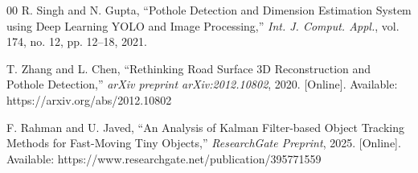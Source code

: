 \documentclass{iopjournal}
\begin{document}
\begin{thebibliography}{00}
R. Singh and N. Gupta, ``Pothole Detection and Dimension Estimation System using Deep Learning YOLO and Image Processing,'' \emph{Int. J. Comput. Appl.}, vol. 174, no. 12, pp. 12--18, 2021.

T. Zhang and L. Chen, ``Rethinking Road Surface 3D Reconstruction and Pothole Detection,'' \emph{arXiv preprint arXiv:2012.10802}, 2020. [Online]. Available: https://arxiv.org/abs/2012.10802

F. Rahman and U. Javed, ``An Analysis of Kalman Filter-based Object Tracking Methods for Fast-Moving Tiny Objects,'' \emph{ResearchGate Preprint}, 2025. [Online]. Available: https://www.researchgate.net/publication/395771559

\end{thebibliography}
\end{document}
